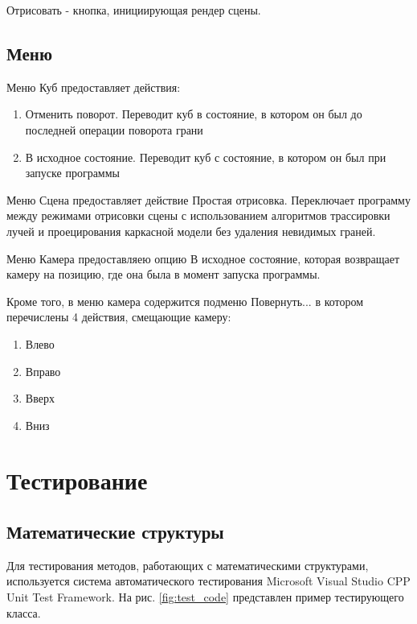 \documentclass[a4paper, 14pt]{report}
\begin{document}
	Отрисовать - кнопка, инициирующая рендер сцены.
	
	\subsection{Меню}
	Меню Куб предоставляет действия:
	\begin{enumerate}
	\item Отменить поворот. Переводит куб в состояние, в котором он был до последней операции поворота грани
	\item В исходное состояние. Переводит куб с состояние, в котором он был при запуске программы
	\end{enumerate}

	Меню Сцена предоставляет действие Простая отрисовка. Переключает программу между режимами отрисовки сцены с использованием алгоритмов трассировки лучей и проецирования каркасной модели без удаления невидимых граней.
	
	Меню Камера предоставляею опцию В исходное состояние, которая возвращает камеру на позицию, где она была в момент запуска программы.
	
	Кроме того, в меню камера содержится подменю Повернуть... в котором перечислены 4 действия, смещающие камеру:
	\begin{enumerate}
		\item Влево
		\item Вправо
		\item Вверх
		\item Вниз
	\end{enumerate}

	\section{Тестирование}
	\subsection{Математические структуры}
	Для тестирования методов, работающих с математическими структурами, используется система автоматического тестирования Microsoft Visual Studio CPP Unit Test Framework. На рис. \ref{fig:test_code} представлен пример тестирующего класса.
	
\end{document}
